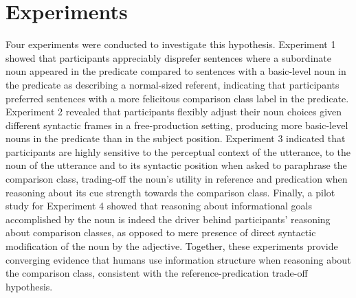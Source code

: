\section{Experiments}
Four experiments were conducted to investigate this hypothesis. Experiment 1 showed that participants appreciably disprefer sentences where a subordinate noun appeared in the predicate compared to sentences with a basic-level noun in the predicate as describing a normal-sized referent, indicating that participants preferred sentences with a more felicitous comparison class label in the predicate. Experiment 2 revealed that participants flexibly adjust their noun choices given different syntactic frames in a free-production setting, producing more basic-level nouns in the predicate than in the subject position. Experiment 3 indicated that participants are highly sensitive to the perceptual context of the utterance, to the noun of the utterance and to its syntactic position when asked to paraphrase the comparison class, trading-off the noun's utility in reference and predication when reasoning about its cue strength towards the comparison class. Finally, a pilot study for Experiment 4 showed that reasoning about informational goals accomplished by the noun is indeed the driver behind participants' reasoning about comparison classes, as opposed to mere presence of direct syntactic modification of the noun by the adjective. %
Together, these experiments provide converging evidence that humans use information structure when reasoning about the comparison class, consistent with the reference-predication trade-off hypothesis. 

